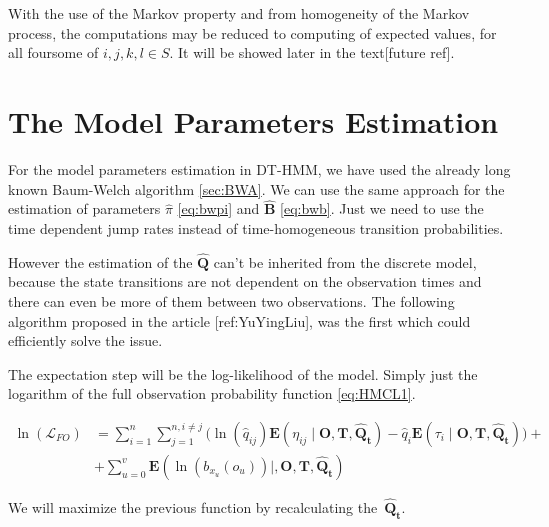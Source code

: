 \documentclass[thesis=M,english]{FITthesis}[2012/10/20]
\newcommand{\matr}[1]{\mathbf{#1}}
\begin{document}
With the use of the Markov property and from homogeneity of the Markov process, the computations may be reduced to computing of expected values, for all foursome of $i,j,k,l \in S$. It will be showed later in the text[future ref].     
   
\section{The Model Parameters Estimation}


For the model parameters estimation in DT-HMM, we have used the already long known Baum-Welch algorithm \ref{sec:BWA}. We can use the same approach for the estimation of parameters $\hat \pi$ \eqref{eq:bwpi} and $\matr{ \hat B }$ \eqref{eq:bwb}. Just we need to use the time dependent jump rates instead of time-homogeneous transition probabilities. %

However the estimation of the $\matr{ \hat Q }$ can't be inherited from the discrete model, because the state transitions are not dependent on the observation times and there can even be more of them between two observations. The following algorithm proposed in the article [ref:YuYingLiu], was the first which could efficiently solve the issue.        

The expectation step will be the log-likelihood of the model. Simply just the logarithm of the full observation probability function \eqref{eq:HMCL1}.

\begin{equation}\label{eq:EMCTHMM}
\begin{aligned}  
 \ln(\mathcal{L}_{FO}) &= \sum_{i=1}^{n} \sum_{j=1}^{n, i \neq j} \big( \ln( \hat q_{ij}) \mathbf{E}( \eta_{ij} \mid \matr{O},\matr{T}, \matr{ \hat Q_t } ) - \hat q_i \mathbf{E}( \tau_i \mid \matr{O},\matr{T}, \matr{ \hat Q_t } ) \big) + \\
    &+ \sum_{u=0}^v \mathbf{E}( \ln( b_{ x_u }(o_u) ) \mid, \matr{O},\matr{T},\matr{\hat Q_t} )
\end{aligned}
\end{equation}

We will maximize the previous function by recalculating the~$\matr{ \hat Q_t }$. 
\end{document}
